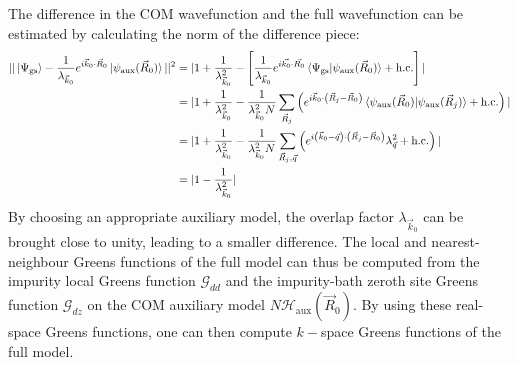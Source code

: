 \documentclass[prb]{revtex4-2}
\begin{document}
The difference in the COM wavefunction and the full wavefunction can be estimated by calculating the norm of the difference piece:
\begin{equation}\begin{aligned}
	||\ket{\Psi_\text{gs}} - \frac{1}{\lambda_{\vec k_0}} e^{i\vec{k}_0\cdot\vec{R}_0} \ket{\psi_\text{aux}(\vec R_0)}||^2 &= |1 + \frac{1}{\lambda_{\vec k_0}^2} - \left[\frac{1}{\lambda_{\vec k_0}}e^{i \vec{k_0}\cdot\vec{R_0}}\braket{\Psi_\text{gs} | \psi_\text{aux}(\vec R_0)} + \text{h.c.}\right]| \\
	&=|1 + \frac{1}{\lambda_{\vec k_0}^2} - \frac{1}{\lambda_{\vec k_0}^2 N}\sum_{\vec R_j} \left(e^{i \vec k_0 \cdot \left( \vec R_j - \vec R_0 \right)}  \braket{\psi_\text{aux}(\vec R_0) | \psi_\text{aux}(\vec R_j) } + \text{h.c.}\right)|\\
	&=|1 + \frac{1}{\lambda_{\vec k_0}^2} - \frac{1}{\lambda_{\vec k_0}^2 N}\sum_{\vec R_j,\vec q} \left(e^{i \left(\vec k_0 - \vec q\right)\cdot \left( \vec R_j - \vec R_0 \right)}\lambda_{\vec q}^2 + \text{h.c.}\right)|\\
	&= |1 - \frac{1}{\lambda_{\vec k_0}^2}|
\end{aligned}\end{equation}
By choosing an appropriate auxiliary model, the overlap factor \(\lambda_{\vec k_0}\) can be brought close to unity, leading to a smaller difference. The local and nearest-neighbour Greens functions of the full model can thus be computed from the impurity local Greens function \(\mathcal{G}_{dd}\) and the impurity-bath zeroth site Greens function \(\mathcal{G}_{dz}\) on the COM auxiliary model \(N \mathcal{H}_\text{aux}(\vec R_0)\). By using these real-space Greens functions, one can then compute \(k-\)space Greens functions of the full model. 
\end{document}
